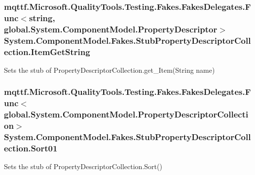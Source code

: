 \hypertarget{class_system_1_1_component_model_1_1_fakes_1_1_stub_property_descriptor_collection_a6d6d4e2d3b94b467910f5b648c1093e5}{
\subsubsection[{Item\-Get\-String}]{\setlength{\rightskip}{0pt plus 5cm}mqttf.\-Microsoft.\-Quality\-Tools.\-Testing.\-Fakes.\-Fakes\-Delegates.\-Func$<$string, global.\-System.\-Component\-Model.\-Property\-Descriptor$>$ System.\-Component\-Model.\-Fakes.\-Stub\-Property\-Descriptor\-Collection.\-Item\-Get\-String}}\label{class_system_1_1_component_model_1_1_fakes_1_1_stub_property_descriptor_collection_a6d6d4e2d3b94b467910f5b648c1093e5}


Sets the stub of Property\-Descriptor\-Collection.\-get\-\_\-\-Item(\-String name)

\hypertarget{class_system_1_1_component_model_1_1_fakes_1_1_stub_property_descriptor_collection_a6c67e014b639e20e170972f201773cae}{
\subsubsection[{Sort01}]{\setlength{\rightskip}{0pt plus 5cm}mqttf.\-Microsoft.\-Quality\-Tools.\-Testing.\-Fakes.\-Fakes\-Delegates.\-Func$<$global.\-System.\-Component\-Model.\-Property\-Descriptor\-Collection$>$ System.\-Component\-Model.\-Fakes.\-Stub\-Property\-Descriptor\-Collection.\-Sort01}}\label{class_system_1_1_component_model_1_1_fakes_1_1_stub_property_descriptor_collection_a6c67e014b639e20e170972f201773cae}


Sets the stub of Property\-Descriptor\-Collection.\-Sort()

